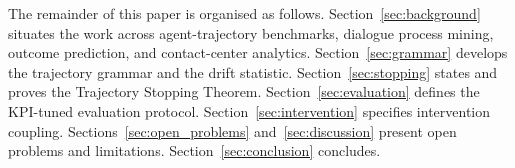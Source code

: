 The remainder of this paper is organised as follows.
Section~\ref{sec:background} situates the work across agent-trajectory benchmarks,
dialogue process mining, outcome prediction, and contact-center analytics.
Section~\ref{sec:grammar} develops the trajectory grammar and the drift statistic.
Section~\ref{sec:stopping} states and proves the Trajectory Stopping Theorem.
Section~\ref{sec:evaluation} defines the KPI-tuned evaluation protocol.
Section~\ref{sec:intervention} specifies intervention coupling.
Sections~\ref{sec:open_problems} and~\ref{sec:discussion} present open problems and limitations.
Section~\ref{sec:conclusion} concludes.
